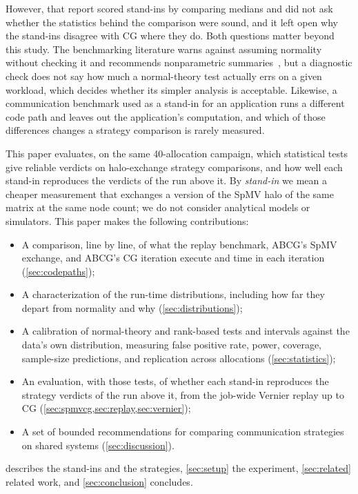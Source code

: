 \documentclass[11pt]{article}
\begin{document}
However, that report scored stand-ins by comparing medians and did not ask whether the
statistics behind the comparison were sound, and it left open why the stand-ins disagree
with CG where they do. Both questions matter beyond this study. The benchmarking
literature warns against assuming normality without checking it and recommends
nonparametric summaries~\cite{hoefler2015scientific,maricq2018taming}, but a diagnostic
check does not say how much a normal-theory test actually errs on a given workload, which
decides whether its simpler analysis is acceptable. Likewise, a communication benchmark
used as a stand-in for an application runs a different code path and leaves out the
application's computation, and which of those differences changes a strategy comparison
is rarely measured.

This paper evaluates, on the same 40-allocation campaign, which statistical tests give
reliable verdicts on halo-exchange strategy comparisons, and how well each stand-in
reproduces the verdicts of the run above it. By \emph{stand-in} we mean a cheaper
measurement that exchanges a version of the SpMV halo of the same matrix at the same node
count; we do not consider analytical models or simulators. This paper makes the following
contributions:
\begin{itemize}
\item A comparison, line by line, of what the replay benchmark, ABCG's SpMV exchange, and
  ABCG's CG iteration execute and time in each iteration (\cref{sec:codepaths});
\item A characterization of the run-time distributions, including how far they depart from
  normality and why (\cref{sec:distributions});
\item A calibration of normal-theory and rank-based tests and intervals against the
  data's own distribution, measuring false positive rate, power, coverage, sample-size
  predictions, and replication across allocations (\cref{sec:statistics});
\item An evaluation, with those tests, of whether each stand-in reproduces the strategy
  verdicts of the run above it, from the job-wide Vernier replay up to CG
  (\cref{sec:spmvcg,sec:replay,sec:vernier});
\item A set of bounded recommendations for comparing communication strategies on shared
  systems (\cref{sec:discussion}).
\end{itemize}
 describes the stand-ins and the strategies, \cref{sec:setup} the
experiment, \cref{sec:related} related work, and \cref{sec:conclusion} concludes.
\end{document}
